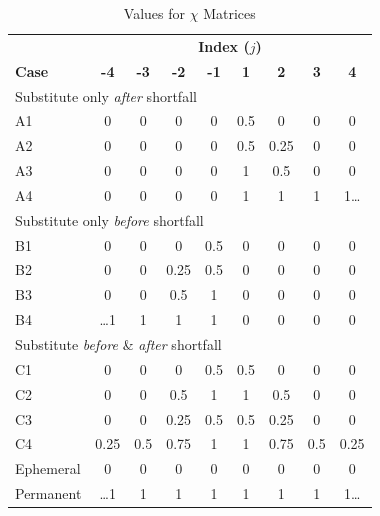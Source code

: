 \documentclass[preprint,12pt]{elsarticle}
\begin{document}
\begin{table}[h]
    \caption{Values for $\chi$ Matrices}
  \label{t:StakeholderChiPreferences}
  \begin{center}
  \begin{tabular}{l c c c c c c c c}
    \hline
    \hline
    & \multicolumn{8}{c}{\textbf{Index ($j$)}}\\\cline{2-9}
    \textbf{Case} &
    \textbf{-4} &
    \textbf{-3} &
    \textbf{-2} &
    \textbf{-1} &
    \textbf{1} &
    \textbf{2} &
    \textbf{3} &
    \textbf{4}\\
    \hline
    \multicolumn{9}{l}{Substitute only \emph{after} shortfall} \\
    A1 &    0 &    0 &    0 &    0 &  0.5 &    0 &    0 &    0 \\                       
    A2 &    0 &    0 &    0 &    0 &  0.5 & 0.25 &    0 &    0 \\                       
    A3 &    0 &    0 &    0 &    0 &    1 &  0.5 &    0 &    0 \\
    A4 &    0 &    0 &    0 &    0 &    1 &    1 &    1 &    1\ldots \\
    \multicolumn{9}{l}{Substitute only \emph{before} shortfall} \\
    B1 &    0 &    0 &    0 &  0.5 &    0 &    0 &    0 &    0 \\                       
    B2 &    0 &    0 & 0.25 &  0.5 &    0 &    0 &    0 &    0 \\                       
    B3 &    0 &    0 &  0.5 &    1 &    0 &    0 &    0 &    0 \\
    B4 & \ldots1 & 1 &    1 &    1 &    0 &    0 &    0 &    0 \\
    \multicolumn{9}{l}{Substitute \emph{before} \& \emph{after} shortfall} \\
    C1 &    0 &    0 &    0 &  0.5 &  0.5 &    0 &    0 &    0 \\                       
    C2 &    0 &    0 &  0.5 &    1 &    1 &  0.5 &    0 &    0 \\                       
    C3 &    0 &    0 & 0.25 &  0.5 &  0.5 & 0.25 &    0 &    0 \\                       
    C4 & 0.25 &  0.5 & 0.75 &    1 &    1 & 0.75 &  0.5 & 0.25 \\                       
    Ephemeral &  0 &  0 &    0 &  0 &    0 &    0 &    0 &    0 \\                       
    Permanent & \ldots 1 &  1 &    1 &  1 &    1 &    1 &    1 &
    1\ldots \\
    \hline
  \end{tabular}
  \end{center}
\end{table}
\end{document}
